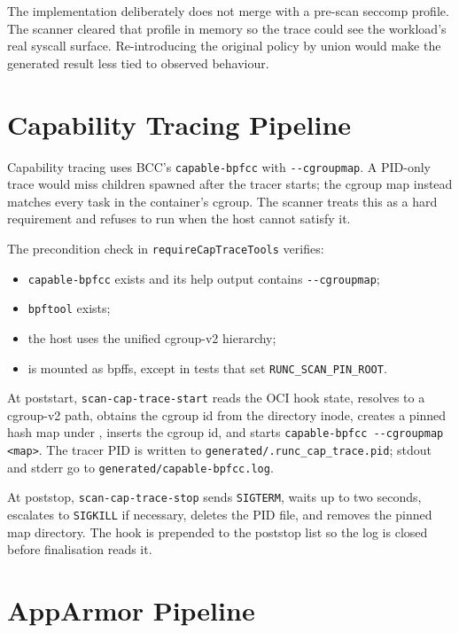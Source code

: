 The implementation deliberately does not merge with a pre-scan seccomp profile. The scanner cleared that profile in memory so the trace could see the workload's real syscall surface. Re-introducing the original policy by union would make the generated result less tied to observed behaviour.

\section{Capability Tracing Pipeline}\label{sec:impl-cap-trace}

Capability tracing uses BCC's \texttt{capable-bpfcc} with \texttt{-{}-cgroupmap}. A PID-only trace would miss children spawned after the tracer starts; the cgroup map instead matches every task in the container's cgroup. The scanner treats this as a hard requirement and refuses to run when the host cannot satisfy it.

The precondition check in \texttt{requireCapTraceTools} verifies:

\begin{itemize}
    \item \texttt{capable-bpfcc} exists and its help output contains \texttt{-{}-cgroupmap};
    \item \texttt{bpftool} exists;
    \item the host uses the unified cgroup-v2 hierarchy;
    \item {} is mounted as bpffs, except in tests that set \texttt{RUNC\_\allowbreak SCAN\_\allowbreak PIN\_\allowbreak ROOT}.
\end{itemize}

At poststart, \texttt{scan-cap-trace-start} reads the OCI hook state, resolves  to a cgroup-v2 path, obtains the cgroup id from the directory inode, creates a pinned hash map under , inserts the cgroup id, and starts \texttt{capable-bpfcc -{}-cgroupmap <map>}. The tracer PID is written to \texttt{generated/.runc\_cap\_trace.pid}; stdout and stderr go to \texttt{generated/capable-bpfcc.log}.

At poststop, \texttt{scan-cap-trace-stop} sends \texttt{SIGTERM}, waits up to two seconds, escalates to \texttt{SIGKILL} if necessary, deletes the PID file, and removes the pinned map directory. The hook is prepended to the poststop list so the log is closed before finalisation reads it.

\section{AppArmor Pipeline}\label{sec:impl-aa}

